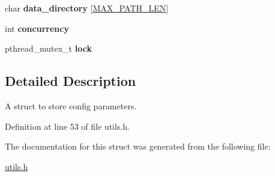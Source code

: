 \begin{DoxyCompactItemize}
\item 
\hypertarget{structconfig__params_a1b3eb9cf6a9517713e258d3677f41156}{char {\bfseries data\-\_\-directory} \mbox{[}\hyperlink{storage_8h_abdd33f362ae3bbdacb5de76473aa8a2f}{M\-A\-X\-\_\-\-P\-A\-T\-H\-\_\-\-L\-E\-N}\mbox{]}}\label{structconfig__params_a1b3eb9cf6a9517713e258d3677f41156}

\item 
\hypertarget{structconfig__params_a558fd63cba5d55cdb271c49d432a88fa}{int {\bfseries concurrency}}\label{structconfig__params_a558fd63cba5d55cdb271c49d432a88fa}

\item 
\hypertarget{structconfig__params_abc0df5c9931d76b7d3a3fa574b768c0f}{pthread\-\_\-mutex\-\_\-t {\bfseries lock}}\label{structconfig__params_abc0df5c9931d76b7d3a3fa574b768c0f}

\end{DoxyCompactItemize}


\subsection{Detailed Description}
A struct to store config parameters. 

Definition at line 53 of file utils.\-h.



The documentation for this struct was generated from the following file\-:\begin{DoxyCompactItemize}
\item 
\hyperlink{utils_8h}{utils.\-h}\end{DoxyCompactItemize}
